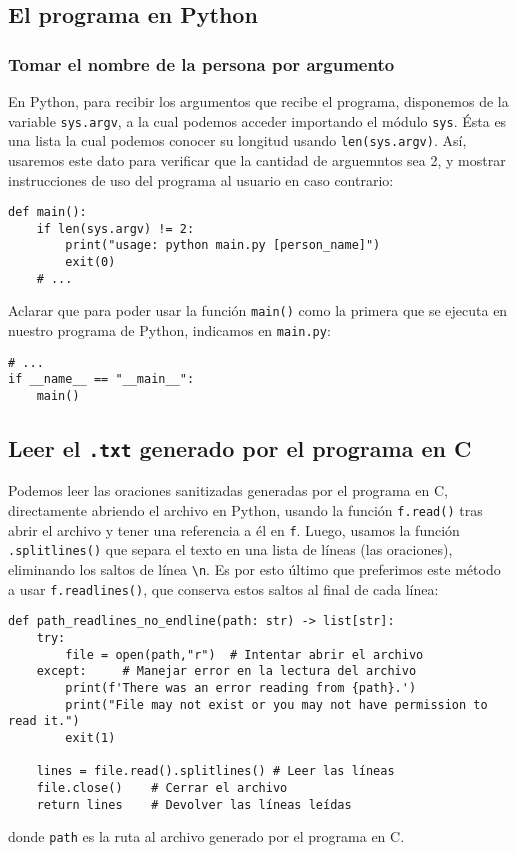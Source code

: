 \documentclass[a4paper]{article}
\begin{document}
\subsection{El programa en Python}

\subsubsection{Tomar el nombre de la persona por argumento}

En Python, para recibir los argumentos que recibe el programa, disponemos de la variable \texttt{sys.argv}, a la cual podemos acceder importando el módulo \texttt{sys}. Ésta es una lista la cual podemos conocer su longitud usando \texttt{len(sys.argv)}. Así, usaremos este dato para verificar que la cantidad de arguemntos sea 2, y mostrar instrucciones de uso del programa al usuario en caso contrario:
\begin{verbatim}
def main():
    if len(sys.argv) != 2:
        print("usage: python main.py [person_name]")
        exit(0)
    # ...
\end{verbatim}
Aclarar que para poder usar la función \texttt{main()} como la primera que se ejecuta en nuestro programa de Python, indicamos en \texttt{main.py}:
\begin{verbatim}
# ...
if __name__ == "__main__":
    main()
\end{verbatim}

\subsection{Leer el \texttt{.txt} generado por el programa en C}

Podemos leer las oraciones sanitizadas generadas por el programa en C, directamente abriendo el archivo en Python, usando la función \texttt{f.read()} tras abrir el archivo y tener una referencia a él en \texttt{f}. Luego, usamos la función \texttt{.splitlines()} que separa el texto en una lista de líneas (las oraciones), eliminando los saltos de línea \texttt{\textbackslash{}n}. Es por esto último que preferimos este método a usar \texttt{f.readlines()}, que conserva estos saltos al final de cada línea:
\begin{verbatim}
def path_readlines_no_endline(path: str) -> list[str]:
    try:
        file = open(path,"r")  # Intentar abrir el archivo
    except:     # Manejar error en la lectura del archivo
        print(f'There was an error reading from {path}.')
        print("File may not exist or you may not have permission to read it.")
        exit(1)

    lines = file.read().splitlines() # Leer las líneas
    file.close()    # Cerrar el archivo
    return lines    # Devolver las líneas leídas
\end{verbatim}
\noindent donde \texttt{path} es la ruta al archivo generado por el programa en C.
\end{document}
